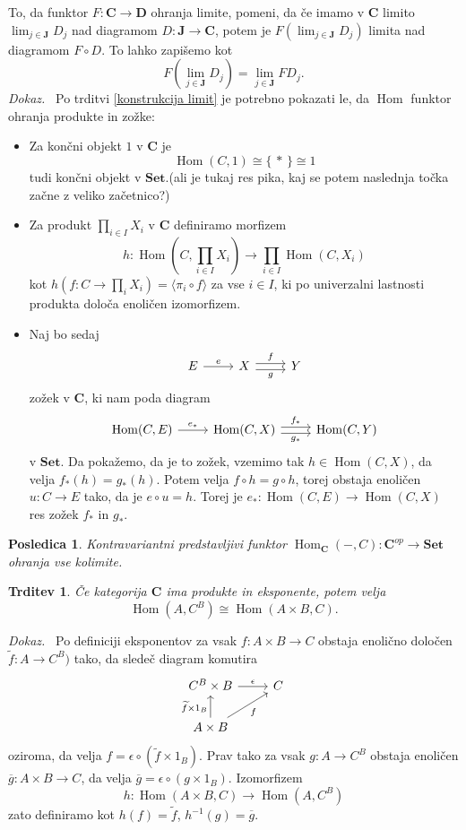 \documentclass[12pt,a4paper]{book}
\theoremstyle{definition}
\theoremstyle{plain}
\newtheorem{trditev}[definicija]{Trditev}
\newtheorem{posledica}{Posledica}[definicija]
\newenvironment{dokaz}{\emph{Dokaz.}\ }{\hspace{\fill}{$\Box$}}
\theoremstyle{definition}
\theoremstyle{remark}
\newcommand{\cat}[1]{\textbf{#1}}
\DeclareMathOperator{\Hom}{Hom}
\renewcommand{\set}[1]{\{\,#1\,\}}
\newcommand{\fprod}[1]{\langle #1 \rangle}
\begin{document}
To, da funktor $F : \cat{C} \to \cat{D}$ ohranja limite, pomeni, da če imamo v $\cat{C}$ limito $\lim_{j \in \cat{J}}D_j$
nad diagramom $D : \cat{J} \to \cat{C}$, potem je $F(\lim_{j \in \cat{J}}D_j)$ limita nad diagramom $F \circ D$. To lahko zapišemo kot
$$F(\lim_{j \in \cat{J}}D_j) = \lim_{j \in \cat{J}}FD_j.$$ 
\begin{dokaz}
Po trditvi \ref{konstrukcija limit} je potrebno pokazati le, da $\Hom$ funktor ohranja produkte in zožke:
%
\begin{itemize}
\item Za končni objekt $1$ v $\cat{C}$ je 
$$\Hom(C,1) \cong \set{*} \cong 1$$
tudi končni objekt v $\cat{Set}.$(ali je tukaj res pika, kaj se potem naslednja točka začne z veliko začetnico?)
\item Za produkt $\prod_{i \in I} X_i$ v $\cat{C}$ definiramo morfizem
$$h : \Hom(C, \prod_{i \in I} X_i) \to \prod_{i \in I} \Hom(C, X_i)$$
kot $h(f : C \to \prod_i X_i) = \fprod{\pi_i \circ f}$ za vse $i \in I$, ki po univerzalni lastnosti produkta določa enoličen izomorfizem.
\item Naj bo sedaj
$$ \begin{tikzcd}[sep=normal]
E \ar[r, "e"] & X \ar[r, shift left, "f"] \ar[r, shift right, "g"'] & Y
\end{tikzcd} $$
zožek v $\cat{C}$, ki nam poda diagram
$$ \begin{tikzcd}[sep=normal]
\Hom(C,E) \ar[r, "e_*"] & \Hom(C,X) \ar[r, shift left, "f_*"] \ar[r, shift right, "g_*"'] & \Hom(C,Y)
\end{tikzcd} $$
v $\cat{Set}$. Da pokažemo, da je to zožek, vzemimo tak $h \in \Hom(C,X)$, da velja $f_*(h) = g_*(h)$. Potem velja $f \circ h = g \circ h$, torej obstaja enoličen $u : C \to E$ tako, da je $e \circ u = h$. Torej je $e_* : \Hom(C,E) \to \Hom(C,X)$ res zožek $f_*$ in $g_*$.
\end{itemize}
\end{dokaz}

\begin{posledica}
Kontravariantni predstavljivi funktor $\Hom_\cat{C}(-,C) : \cat{C}^{op} \to \cat{Set}$ ohranja vse kolimite.
\end{posledica}

\begin{trditev}
Če kategorija $\cat{C}$ ima produkte in eksponente, potem velja
$$\Hom(A, C^B) \cong \Hom(A \times B, C).$$
\end{trditev}
\begin{dokaz}
Po definiciji eksponentov za vsak $f: A \times B \to C$ obstaja enolično določen $\widetilde{f} : A \to C^B)$ tako, da sledeč diagram komutira
$$
\begin{tikzcd}
C^B \times B \ar[r, "\epsilon"] & C \\
A \times B \ar[u, "\widetilde{f} \times 1_B"] \ar[ur, "f"']
\end{tikzcd}
$$
oziroma, da velja $f = \epsilon \circ (\widetilde{f} \times 1_B)$. Prav tako za vsak $g : A \to C^B$ obstaja enoličen $\overline{g}: A \times B \to C$, da velja $\overline{g} = \epsilon \circ (g \times 1_B)$. 
Izomorfizem 
$$h : \Hom(A \times B, C) \to \Hom(A, C^B)$$
zato definiramo kot $h(f) = \widetilde{f}$, $h^{-1}(g) = \overline{g}$.
\end{dokaz}
\end{document}
